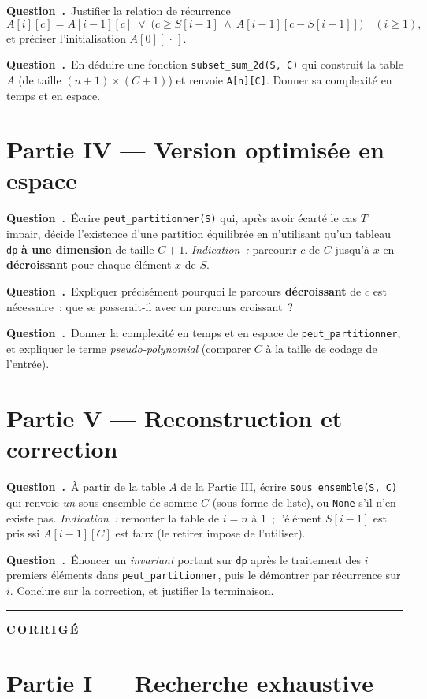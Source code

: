 \documentclass[11pt,a4paper]{article}
\newcounter{qcnt}
\newcommand{\Q}{\medskip\par\stepcounter{qcnt}\noindent\textbf{Question~\theqcnt.}~}
\newcommand{\code}[1]{\lstinline!#1!}
\begin{document}
\Q Justifier la relation de récurrence
$$A[i][c] = A[i-1][c] \;\lor\; \bigl(c \ge S[i-1] \ \land\ A[i-1][c - S[i-1]]\bigr)
\quad (i \ge 1),$$
et préciser l'initialisation $A[0][\,\cdot\,]$.

\Q En déduire une fonction \code{subset_sum_2d(S, C)} qui construit la table $A$ (de taille
$(n+1)\times(C+1)$) et renvoie \code{A[n][C]}. Donner sa complexité en temps et en espace.

\section*{Partie IV --- Version optimisée en espace}

\Q Écrire \code{peut_partitionner(S)} qui, après avoir écarté le cas $T$ impair, décide
l'existence d'une partition équilibrée en n'utilisant qu'un tableau \code{dp} \textbf{à une
dimension} de taille $C+1$. \emph{Indication~:} parcourir $c$ de $C$ jusqu'à $x$ en
\textbf{décroissant} pour chaque élément $x$ de $S$.

\Q Expliquer précisément pourquoi le parcours \textbf{décroissant} de $c$ est nécessaire~: que se
passerait-il avec un parcours croissant~?

\Q Donner la complexité en temps et en espace de \code{peut_partitionner}, et expliquer le terme
\emph{pseudo-polynomial} (comparer $C$ à la taille de codage de l'entrée).

\section*{Partie V --- Reconstruction et correction}

\Q À partir de la table $A$ de la Partie III, écrire \code{sous_ensemble(S, C)} qui renvoie
\emph{un} sous-ensemble de somme $C$ (sous forme de liste), ou \code{None} s'il n'en existe pas.
\emph{Indication~:} remonter la table de $i=n$ à $1$~; l'élément $S[i-1]$ est pris ssi
$A[i-1][C]$ est faux (le retirer impose de l'utiliser).

\Q Énoncer un \emph{invariant} portant sur \code{dp} après le traitement des $i$ premiers éléments
dans \code{peut_partitionner}, puis le démontrer par récurrence sur $i$. Conclure sur la
correction, et justifier la terminaison.

\newpage
\setcounter{qcnt}{0}
\bigskip
\hrule
\bigskip
{\Large\bfseries C\,O\,R\,R\,I\,G\,É}
\medskip

\section*{Partie I --- Recherche exhaustive}
\end{document}
